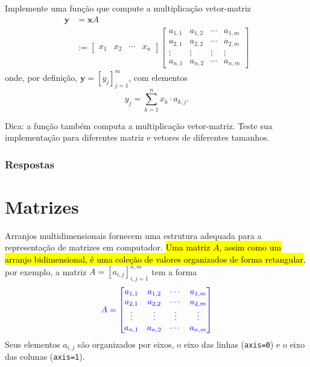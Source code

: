 \begin{exer}
  Implemente uma função que compute a multiplicação vetor-matriz
  \begin{subequations}
    \begin{align}
      \pmb{y} &= \pmb{x}A \\
              &:= \begin{bmatrix}
                x_1 & x_2 & \cdots & x_n
              \end{bmatrix}
              \begin{bmatrix}
                a_{1,1} & a_{1,2} & \cdots & a_{1,m}\\
                a_{2,1} & a_{2,2} & \cdots & a_{2,m}\\
                \vdots & \vdots & \vdots & \vdots\\
                a_{n,1} & a_{n,2} & \cdots & a_{n,m}
              \end{bmatrix}
    \end{align}
  \end{subequations}
  onde, por definição, $\pmb{y} = [y_j]_{j=1}^m$, com elementos
  \begin{equation}
    y_j = \sum_{k=1}^n x_k\cdot a_{k,j}.
  \end{equation}
\end{exer}
\begin{resp}
  Dica: a função {\PYTHONnumpyDOTdot} também computa a multiplicação vetor-matriz. Teste sua implementação para diferentes matriz e vetores de diferentes tamanhos.
\end{resp}

\ifisbook
\subsubsection{Respostas}
\shipoutAnswer
\fi


\section{Matrizes}\label{cap_arr_sec_mat}

Arranjos multidimensionais fornecem uma estrutura adequada para a representação de matrizes em computador. \hl{Uma matriz $A$, assim como um arranjo bidimensional, é uma coleção de valores organizados de forma retangular}, por exemplo, a matriz $A = [a_{i,j}]_{i,j=1}^{n,m}$ tem a forma
\begin{equation}\color{blue}A =
  \begin{bmatrix}
    a_{1,1} & a_{1,2} & \cdots & a_{1,m}\\
    a_{2,1} & a_{2,2} & \cdots & a_{2,m}\\
    \vdots & \vdots & \vdots & \vdots\\
    a_{n,1} & a_{n,2} & \cdots & a_{n,m}
  \end{bmatrix}
\end{equation}
Seus elementos $a_{i,j}$ são organizados por eixos, o eixo das linhas (\lstinline+axis=0+) e o eixo das colunas (\lstinline+axis=1+).


